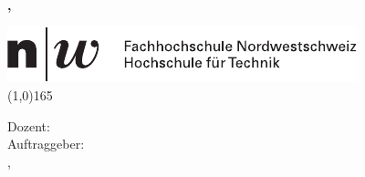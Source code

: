 \thispagestyle{plain}

\begin{titlepage}
	\begin{center}
		\vspace*{1cm}
		\textbf{
			\hspace{-0.12cm}\LARGE{\doctype}\\
			\Huge{\titel}\\
			\vspace{0.5cm}
			\large{\untertitel}\\
			\vspace{1.5cm}
			\large{\autorA, \autorB}\\
		}
		\vspace{1cm}
		\vfill
		\large{
			\hspace{-0.83cm} \includegraphics{images/fhnw_logo}\\
			\line(1,0){165}	

			\vspace{0.5cm}
			Dozent: \dozent \\
			\vspace{0.1cm}
			Auftraggeber:  \auftraggeber \\
			\vspace{0.5cm}
			\ort, \datum
		}
	\end{center}
\end{titlepage}